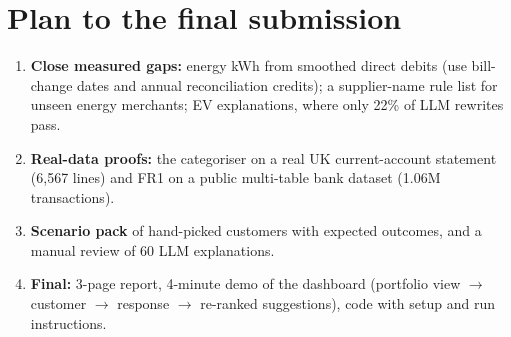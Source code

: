 \documentclass[10pt,a4paper]{article}
\begin{document}
\section{Plan to the final submission}
\begin{enumerate}[leftmargin=1.4em]
  \item \textbf{Close measured gaps:} energy kWh from smoothed direct debits (use bill-change dates and annual
        reconciliation credits); a supplier-name rule list for unseen energy merchants; EV explanations, where only 22\% of
        LLM rewrites pass.
  \item \textbf{Real-data proofs:} the categoriser on a real UK current-account statement (6,567 lines) and FR1 on a
        public multi-table bank dataset (1.06M transactions).
  \item \textbf{Scenario pack} of hand-picked customers with expected outcomes, and a manual review of 60 LLM explanations.
  \item \textbf{Final:} 3-page report, 4-minute demo of the dashboard (portfolio view $\rightarrow$ customer $\rightarrow$
        response $\rightarrow$ re-ranked suggestions), code with setup and run instructions.
\end{enumerate}
\end{document}

